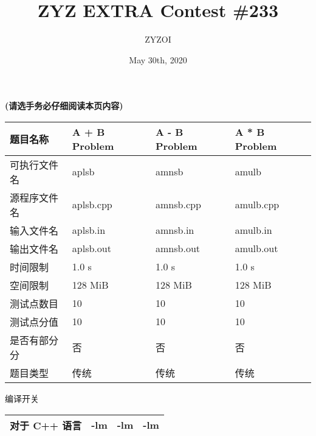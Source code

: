 \documentclass{article}
\title{ZYZ EXTRA Contest \#233}
\author{ZYZOI}
\date{May 30th, 2020}
\begin{document}
  \maketitle

  \begin{center}
  \textbf{(请选手务必仔细阅读本页内容)}
  \end{center}


  \begin{center}
  \begin{tabular}{|p{3cm}|p{3cm}|p{3cm}|p{3cm}|}
    \hline
    题目名称   & A + B Problem & A - B Problem & A * B Problem \\ \hline
    可执行文件名 & aplsb         & amnsb         & amulb         \\ \hline
    源程序文件名 & aplsb.cpp     & amnsb.cpp     & amulb.cpp     \\ \hline
    输入文件名  & aplsb.in      & amnsb.in      & amulb.in      \\ \hline
    输出文件名  & aplsb.out     & amnsb.out     & amulb.out     \\ \hline
    时间限制   & 1.0 s         & 1.0 s         & 1.0 s         \\ \hline
    空间限制   & 128 MiB       & 128 MiB       & 128 MiB       \\ \hline
    测试点数目  & 10            & 10            & 10            \\ \hline
    测试点分值  & 10            & 10            & 10            \\ \hline
    是否有部分分 & 否             & 否             & 否             \\ \hline
    题目类型   & 传统            & 传统            & 传统            \\ \hline
  \end{tabular}
  \end{center}

  \begin{center}
    编译开关 \\

    \begin{tabular}{|p{3cm}|p{3cm}|p{3cm}|p{3cm}|}
      \hline
      对于 C++ 语言 & -lm & -lm & -lm \\ \hline
    \end{tabular}
  \end{center}
\end{document}
